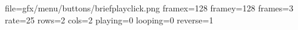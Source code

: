file=gfx/menu/buttons/briefplayclick.png
framex=128
framey=128
frames=3
rate=25
rows=2
cols=2
playing=0
looping=0
reverse=1